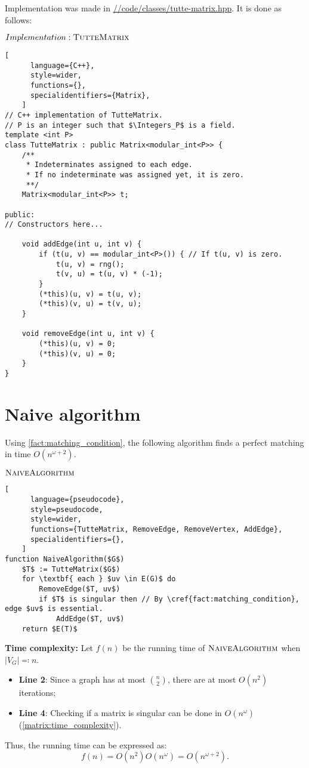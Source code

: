 Implementation was made in \href{https://github.com/antoniomsah/algebraic-max-matching/blob/main/code/classes/tutte-matrix.hpp}{//code/classes/tutte-matrix.hpp}.
It is done as follows:
\begin{programruledcaption}{\(Implementation: \textsc{TutteMatrix}\)}
    \begin{lstlisting}[
      language={C++},
      style=wider,
      functions={},
      specialidentifiers={Matrix},
    ]
// C++ implementation of TutteMatrix.
// P is an integer such that $\Integers_P$ is a field.
template <int P>
class TutteMatrix : public Matrix<modular_int<P>> {
    /** 
     * Indeterminates assigned to each edge.
     * If no indeterminate was assigned yet, it is zero.
     **/ 
    Matrix<modular_int<P>> t; 
    
public:
// Constructors here...

    void addEdge(int u, int v) {
        if (t(u, v) == modular_int<P>()) { // If t(u, v) is zero.
            t(u, v) = rng();
            t(v, u) = t(u, v) * (-1);
        }
        (*this)(u, v) = t(u, v);
        (*this)(v, u) = t(v, u);
    }

    void removeEdge(int u, int v) {
        (*this)(u, v) = 0;
        (*this)(v, u) = 0;
    }
}
    \end{lstlisting}
\end{programruledcaption}


\section{Naive algorithm}


Using \cref{fact:matching_condition}, the following algorithm finds a perfect matching in time \(O(n^{\omega+2})\).
\begin{programruledcaption}{\(\textsc{NaiveAlgorithm}\)}
    \begin{lstlisting}[
      language={pseudocode},
      style=pseudocode,
      style=wider,
      functions={TutteMatrix, RemoveEdge, RemoveVertex, AddEdge},
      specialidentifiers={},
    ]
function NaiveAlgorithm($G$)
    $T$ := TutteMatrix($G$)
    for \textbf{ each } $uv \in E(G)$ do
        RemoveEdge($T, uv$)
        if $T$ is singular then // By \cref{fact:matching_condition}, edge $uv$ is essential.
            AddEdge($T, uv$)
    return $E(T)$
    \end{lstlisting}
\end{programruledcaption}
\noindent
\textbf{Time complexity:}
Let \(f(n)\) be the running time of \(\textsc{NaiveAlgorithm}\) when \(|V_G| \eqcolon n\).
\begin{itemize}
    \item \textbf{Line 2}: Since a graph has at most \(\binom{n}{2}\), there are at most \(O(n^2)\) iterations;
    \item \textbf{Line 4}: Checking if a matrix is singular can be done in \(O(n^\omega)\) (\cref{matrix:time_complexity}).
\end{itemize}
Thus, the running time can be expressed as:
\[
    f(n) = O(n^2) O(n^\omega) = O(n^{\omega+2}).
\]


